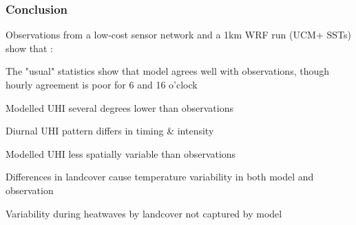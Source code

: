 \documentclass[aspectratio=169, 10pt]{beamer}
\begin{document}
\begin{frame}
\frametitle{Conclusion}
Observations from a low-cost sensor network and a 1km WRF run (UCM+ SSTs) show that : 
\begin{itemize}
\large{
\item The "usual" statistics show that model agrees well with observations, though hourly agreement is poor for 6 and 16 o'clock
\item Modelled UHI several degrees lower than observations
\item Diurnal UHI pattern differs in timing \& intensity
\item Modelled UHI less spatially variable than observations 
\item Differences in landcover cause temperature variability in both model and observation
\item Variability during heatwaves by landcover not captured by model
}
\end{itemize}


%
\end{frame}
%
%
%
%
 






\end{document}
